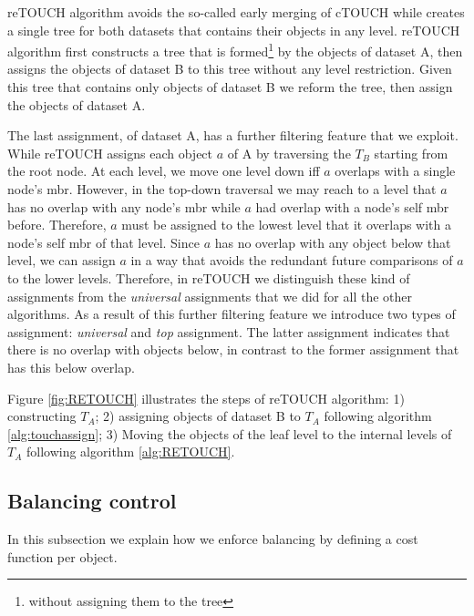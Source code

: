 \documentclass{vldb}
\newcommand{\cSJ}{cTOUCH}
\newcommand{\reSJ}{reTOUCH}
\begin{document}
{\reSJ} algorithm avoids the so-called early merging of {\cSJ} while creates a single tree for both datasets that contains their objects in any level. {\reSJ} algorithm first constructs a tree that is formed\footnote{without assigning them to the tree} by the objects of dataset A, then assigns the objects of dataset B to this tree without any level restriction. Given this tree that contains only objects of dataset B we reform the tree, then assign the objects of dataset A.

The last assignment, of dataset A, has a further filtering feature that we exploit.  While {\reSJ} assigns each object $a$ of A by traversing the $T_B$ starting from the root node. At each level, we move one level down iff $a$ overlaps with a single node's mbr. However, in the top-down traversal we may reach to a level that $a$ has no overlap with any node's mbr while $a$ had overlap with a node's self mbr before. Therefore, $a$ must be assigned to the lowest level that it overlaps with a node's self mbr of that level. Since $a$ has no overlap with any object below that level, we can assign $a$ in a way that avoids the redundant future comparisons of $a$ to the lower levels. Therefore, in {\reSJ} we distinguish these kind of assignments from the \emph{universal} assignments that we did for all the other algorithms.
As a result of this further filtering feature we introduce two types of assignment: \emph{universal} and \emph{top} assignment. The latter assignment indicates that there is no overlap with objects below, in contrast to the former assignment that has this below overlap.

Figure \ref{fig:RETOUCH} illustrates the steps of {\reSJ} algorithm: 1) constructing $T_{A}$; 2) assigning objects of dataset B to $T_A$ following algorithm \ref{alg:touchassign}; 3) Moving the objects of the leaf level to the internal levels of $T_{A}$ following algorithm \ref{alg:RETOUCH}.

\subsection{Balancing control}
In this subsection we explain how we enforce balancing by defining a cost function per object.
\end{document}
